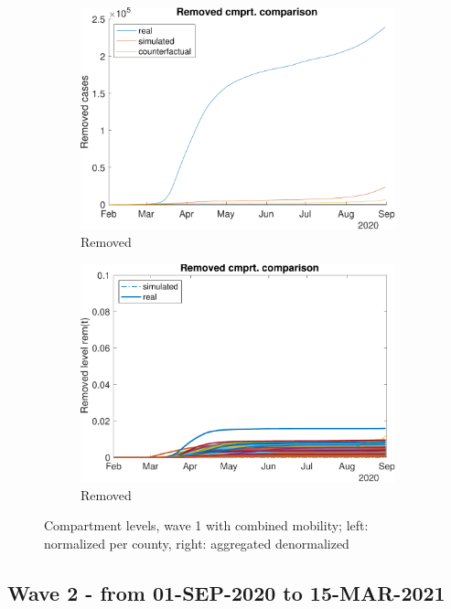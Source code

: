 \begin{figure}[hbtp]
\begin{subfigure}[b]{.45\linewidth}
         \includegraphics[width=\linewidth]{img/210907_221615_combined_wave1/figures/COMP_rem}
         \caption{Removed}
         \label{fig:compAggrCombWave1Rem}
     \end{subfigure}
     \hfill
     \begin{subfigure}[b]{.45\linewidth}
         \centering
         \includegraphics[width=\linewidth]{img/210907_221615_combined_wave1/figures/SEIR_r_sim-vs-real}
         \caption{Removed}
         \label{fig:compCombWave1Rem}
     \end{subfigure}     
     \caption{Compartment levels, wave 1 with combined mobility; left: normalized per county, right: aggregated denormalized}
     \label{fig:compCombWave1}
\end{figure}

\subsection{Wave 2 - from 01-SEP-2020 to 15-MAR-2021}

